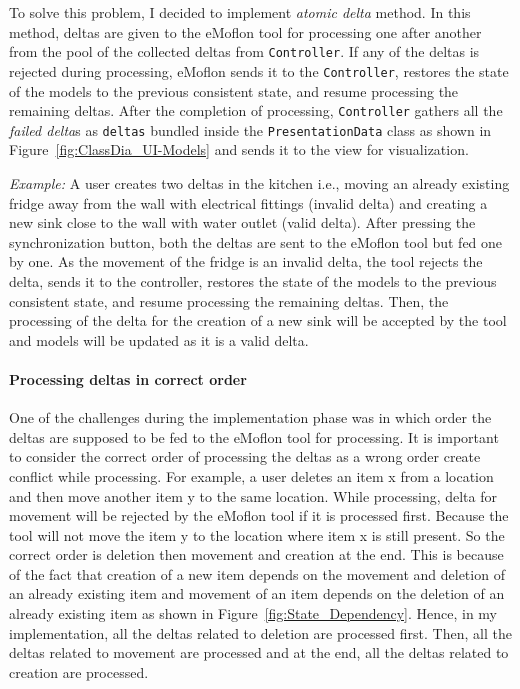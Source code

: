 To solve this problem, I decided to implement \textit{atomic delta} method. In this method, deltas are given to the eMoflon tool for processing one after another from the pool of the collected deltas from \texttt{Controller}. If any of the deltas is rejected during processing, eMoflon sends it to the \texttt{Controller}, restores the state of the models to the previous consistent state, and resume processing the remaining deltas. After the completion of processing, \texttt{Controller} gathers all the \textit{failed delta}s as \texttt{deltas} bundled inside the \texttt{PresentationData} class as shown in Figure~\ref{fig:ClassDia_UI-Models} and sends it to the view for visualization. 

\textit{Example:} A user creates two deltas in the kitchen i.e., moving an already existing fridge away from the wall with electrical fittings (invalid delta) and creating a new sink close to the wall with water outlet (valid delta). After pressing the synchronization button, both the deltas are sent to the eMoflon tool but fed one by one. As the movement of the fridge is an invalid delta, the tool rejects the delta, sends it to the controller, restores the state of the models to the previous consistent state, and resume processing the remaining deltas. Then, the processing of the delta for the creation of a new sink will be accepted by the tool and models will be updated as it is a valid delta.

\paragraph{Processing deltas in correct order}
One of the challenges during the implementation phase was in which order the deltas are supposed to be fed to the eMoflon tool for processing. It is important to consider the correct order of processing the deltas as a wrong order create conflict while processing. For example, a user deletes an item x from a location and then move another item y to the same location. While processing, delta for movement will be rejected by the eMoflon tool if it is processed first. Because the tool will not move the item y to the location where item x is still present. So the correct order is deletion then movement and creation at the end. This is because of the fact that creation of a new item depends on the movement and deletion of an already existing item and movement of an item depends on the deletion of an already existing item as shown in Figure~\ref{fig:State_Dependency}. Hence, in my implementation, all the deltas related to deletion are processed first. Then, all the deltas related to movement are processed and at the end, all the deltas related to creation are processed.  

